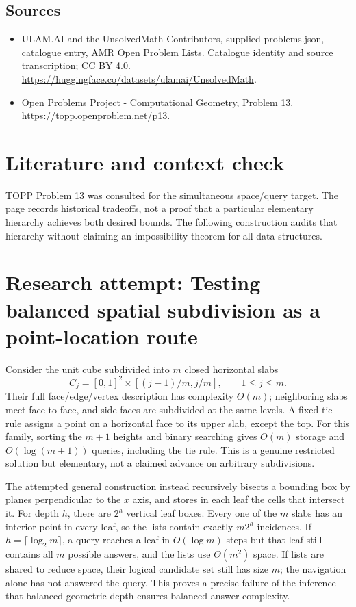 \documentclass[11pt,a4paper]{article}
\begin{document}
\subsection{Sources}
\begin{itemize}
\item[S1] ULAM.AI and the UnsolvedMath Contributors, supplied problems.json, catalogue entry, AMR Open Problem Lists. Catalogue identity and source transcription; CC BY 4.0.
\url{https://huggingface.co/datasets/ulamai/UnsolvedMath}.
\item[S2] Open Problems Project - Computational Geometry, Problem 13. 
\url{https://topp.openproblem.net/p13}.
\end{itemize}

\section{Literature and context check}
TOPP Problem 13 was consulted for the simultaneous space/query target. The
page records historical tradeoffs, not a proof that a particular elementary
hierarchy achieves both desired bounds. The following construction audits that
hierarchy without claiming an impossibility theorem for all data structures.
\section{Research attempt: Testing balanced spatial subdivision as a point-location route}
Consider the unit cube subdivided into $m$ closed horizontal slabs
\[
 C_j=[0,1]^2\times[(j-1)/m,j/m],\qquad 1\le j\le m.
\]
Their full face/edge/vertex description has complexity $\Theta(m)$; neighboring
slabs meet face-to-face, and side faces are subdivided at the same levels. A fixed
tie rule assigns a point on a horizontal face to its upper slab, except the top.
For this family, sorting the $m+1$ heights and binary searching gives $O(m)$
storage and $O(\log(m+1))$ queries, including the tie rule. This is a genuine
restricted solution but elementary, not a claimed advance on arbitrary subdivisions.

The attempted general construction instead recursively bisects a bounding box
by planes perpendicular to the $x$ axis, and stores in each leaf the cells that
intersect it. For depth $h$, there are $2^h$ vertical leaf boxes. Every one of the
$m$ slabs has an interior point in every leaf, so the lists contain exactly
$m2^h$ incidences. If $h=\lceil\log_2m\rceil$, a query reaches a leaf in
$O(\log m)$ steps but that leaf still contains all $m$ possible answers, and
the lists use $\Theta(m^2)$ space. If lists are shared to reduce space, their
logical candidate set still has size $m$; the navigation alone has not answered
the query. This proves a precise failure of the inference that balanced geometric
depth ensures balanced answer complexity.
\end{document}
